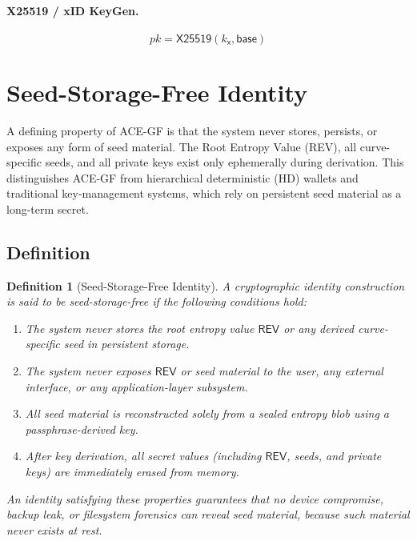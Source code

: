 \documentclass[12pt,a4paper]{article}
\newtheorem{definition}{Definition}
\begin{document}
  \paragraph{X25519 / xID KeyGen.}
  \[
   pk = \mathsf{X25519}(k_{\mathsf{x}}, \mathsf{base})
  \]

  \section{Seed-Storage-Free Identity}

  A defining property of ACE-GF is that the system never stores, persists, or
  exposes any form of seed material. The Root Entropy Value (REV), all
  curve-specific seeds, and all private keys exist only ephemerally during
  derivation. This distinguishes ACE-GF from hierarchical deterministic (HD)
  wallets and traditional key-management systems, which rely on persistent seed
  material as a long-term secret.

  \subsection{Definition}

  \begin{definition}[Seed-Storage-Free Identity]
   A cryptographic identity construction is said to be \emph{seed-storage-free}
   if the following conditions hold:

   \begin{enumerate}
  \item The system never stores the root entropy value $\mathsf{REV}$
  or any derived curve-specific seed in persistent storage.

  \item The system never exposes $\mathsf{REV}$ or seed material to the user,
  any external interface, or any application-layer subsystem.

  \item All seed material is reconstructed solely from a sealed entropy blob
  using a passphrase-derived key.

  \item After key derivation, all secret values (including $\mathsf{REV}$,
  seeds, and private keys) are immediately erased from memory.

   \end{enumerate}
   An identity satisfying these properties guarantees that no device compromise,
   backup leak, or filesystem forensics can reveal seed material, because such
   material never exists at rest.
  \end{definition}
\end{document}
